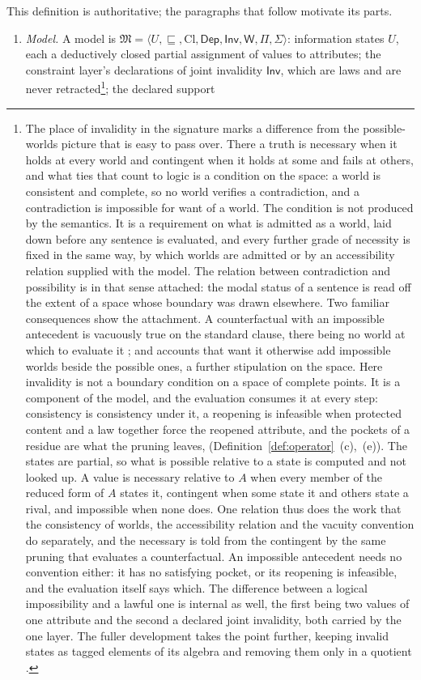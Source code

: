 \begin{definition}\label{def:operator}
This definition is authoritative; the paragraphs that follow motivate its parts.
\begin{enumerate}
\item[(a)] \emph{Model.} A model is $\mathfrak{M} = \langle U, \sqsubseteq, \mathrm{Cl}, \mathsf{Dep}, \mathsf{Inv}, \mathsf{W}, \Pi, \Sigma \rangle$: information states $U$, each a deductively closed partial assignment of values to attributes; the constraint layer's declarations of joint invalidity $\mathsf{Inv}$, which are laws and are never retracted\footnote{The place of invalidity in the signature marks a difference from the possible-worlds picture that is easy to pass over. There a truth is necessary when it holds at every world and contingent when it holds at some and fails at others, and what ties that count to logic is a condition on the space: a world is consistent and complete, so no world verifies a contradiction, and a contradiction is impossible for want of a world. The condition is not produced by the semantics. It is a requirement on what is admitted as a world, laid down before any sentence is evaluated, and every further grade of necessity is fixed in the same way, by which worlds are admitted or by an accessibility relation supplied with the model. The relation between contradiction and possibility is in that sense attached: the modal status of a sentence is read off the extent of a space whose boundary was drawn elsewhere. Two familiar consequences show the attachment. A counterfactual with an impossible antecedent is vacuously true on the standard clause, there being no world at which to evaluate it \parencite{lewis1973}; and accounts that want it otherwise add impossible worlds beside the possible ones, a further stipulation on the space. Here invalidity is not a boundary condition on a space of complete points. It is a component of the model, and the evaluation consumes it at every step: consistency is consistency under it, a reopening is infeasible when protected content and a law together force the reopened attribute, and the pockets of a residue are what the pruning leaves, (Definition~\ref{def:operator}~(c),~(e)). The states are partial, so what is possible relative to a state is computed and not looked up. A value is necessary relative to $A$ when every member of the reduced form of $A$ states it, contingent when some state it and others state a rival, and impossible when none does. One relation thus does the work that the consistency of worlds, the accessibility relation and the vacuity convention do separately, and the necessary is told from the contingent by the same pruning that evaluates a counterfactual. An impossible antecedent needs no convention either: it has no satisfying pocket, or its reopening is infeasible, and the evaluation itself says which. The difference between a logical impossibility and a lawful one is internal as well, the first being two values of one attribute and the second a declared joint invalidity, both carried by the one layer. The fuller development takes the point further, keeping invalid states as tagged elements of its algebra and removing them only in a quotient \parencite{Aethus, AethusTree}.}; the declared support 
\end{enumerate}
\end{definition}
